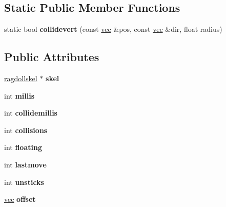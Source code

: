 \subsection*{Static Public Member Functions}
\begin{DoxyCompactItemize}
\item 
\mbox{\label{structragdolldata_a2c7ec8e6cffa5b4eb8691e1dd1e421a2}} 
static bool {\bfseries collidevert} (const \hyperlink{structvec}{vec} \&pos, const \hyperlink{structvec}{vec} \&dir, float radius)
\end{DoxyCompactItemize}
\subsection*{Public Attributes}
\begin{DoxyCompactItemize}
\item 
\mbox{\label{structragdolldata_a04877378324bd8179b3c0a07368107b0}} 
\hyperlink{structragdollskel}{ragdollskel} $\ast$ {\bfseries skel}
\item 
\mbox{\label{structragdolldata_abf6ad5e25d340404727908e39d793a62}} 
int {\bfseries millis}
\item 
\mbox{\label{structragdolldata_a8355fed812785f7650f407acb5b76803}} 
int {\bfseries collidemillis}
\item 
\mbox{\label{structragdolldata_a234eee5c54b2471288098553988f8af3}} 
int {\bfseries collisions}
\item 
\mbox{\label{structragdolldata_a0bdcb9a59dcbe6302265c149e2c52f96}} 
int {\bfseries floating}
\item 
\mbox{\label{structragdolldata_a2ba53b60bb93300212e474564dec8610}} 
int {\bfseries lastmove}
\item 
\mbox{\label{structragdolldata_add6b5784cb08419e8f7bd86e245f63d4}} 
int {\bfseries unsticks}
\item 
\mbox{\label{structragdolldata_ad1221a12285ca11c4ffd90db0e78ddc3}} 
\hyperlink{structvec}{vec} {\bfseries offset}

\end{DoxyCompactItemize}
